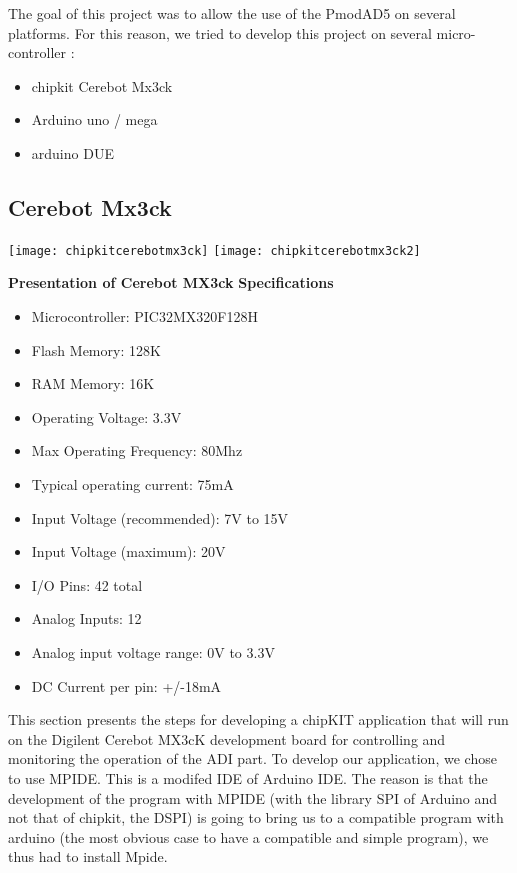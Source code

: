 \documentclass[10pt,a4paper]{report}
\begin{document}
The goal of this project was to allow the use of the PmodAD5 on several platforms. For this reason, we tried to develop this project on several micro-controller :
\begin{itemize}
\item chipkit Cerebot Mx3ck
\item Arduino uno / mega 
\item arduino DUE
\end{itemize} 

\subsection{Cerebot Mx3ck}



\texttt{[image: chipkitcerebotmx3ck]}
\texttt{[image: chipkitcerebotmx3ck2]}





\textbf{Presentation of Cerebot MX3ck}
\textbf{Specifications}
\begin{itemize}
\item Microcontroller: PIC32MX320F128H
\item Flash Memory: 128K
\item RAM Memory: 16K
\item Operating Voltage: 3.3V
\item Max Operating Frequency: 80Mhz
\item Typical operating current: 75mA
\item Input Voltage (recommended): 7V to 15V
\item Input Voltage (maximum): 20V
\item I/O Pins: 42 total
\item Analog Inputs: 12
\item Analog input voltage range: 0V to 3.3V
\item DC Current per pin: +/-18mA \\
\end{itemize}

This section presents the steps for developing a chipKIT application that will run on the Digilent Cerebot MX3cK development board for controlling and monitoring the operation of the ADI part.
To develop our application, we chose to use MPIDE. This is a modifed IDE of Arduino IDE. The reason is that the development of the program with MPIDE (with the library SPI of Arduino and not that of chipkit, the DSPI) is going to bring us to a compatible program with arduino (the most obvious case to have a compatible and simple program), we thus had to install Mpide.
\end{document}
